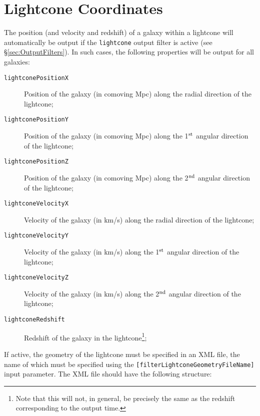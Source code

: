 \section{Lightcone Coordinates}\label{sec:OutputLightcone}

The position (and velocity and redshift) of a galaxy within a lightcone will automatically be output if the {\tt lightcone} output filter is active (see \S\ref{sec:OutputFilters}). In such cases, the following properties will be output for all galaxies:
\begin{description}
 \item [{\tt lightconePositionX}] Position of the galaxy (in comoving Mpc) along the radial direction of the lightcone;
 \item [{\tt lightconePositionY}] Position of the galaxy (in comoving Mpc) along the 1$^{\rm st}$ angular direction of the lightcone;
 \item [{\tt lightconePositionZ}] Position of the galaxy (in comoving Mpc) along the 2$^{\rm nd}$ angular direction of the lightcone;
 \item [{\tt lightconeVelocityX}] Velocity of the galaxy (in km/s) along the radial direction of the lightcone;
 \item [{\tt lightconeVelocityY}] Velocity of the galaxy (in km/s) along the 1$^{\rm st}$ angular direction of the lightcone;
 \item [{\tt lightconeVelocityZ}] Velocity of the galaxy (in km/s) along the 2$^{\rm nd}$ angular direction of the lightcone;
 \item [{\tt lightconeRedshift}] Redshift of the galaxy in the lightcone\footnote{Note that this will not, in general, be precisely the same as the redshift corresponding to the output time.};
\end{description}
If active, the geometry of the lightcone must be specified in an XML file, the name of which must be specified using the {\tt [filterLightconeGeometryFileName]} input parameter. The XML file should have the following structure:
